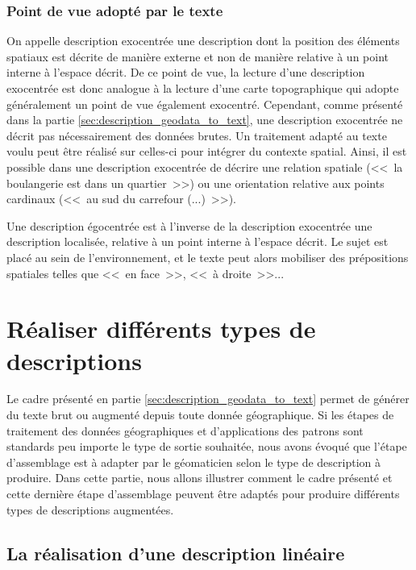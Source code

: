 \subsubsection{Point de vue adopté par le texte}

On appelle description exocentrée une description dont la position des éléments spatiaux est décrite de manière externe et non de manière relative à un point interne à l'espace décrit. De ce point de vue, la lecture d'une description exocentrée est donc analogue à la lecture d'une carte topographique qui adopte généralement un point de vue également exocentré. Cependant, comme présenté dans la partie \ref{sec:description_geodata_to_text}, une description exocentrée ne décrit pas nécessairement des données brutes. Un traitement adapté au texte voulu peut être réalisé sur celles-ci pour intégrer du contexte spatial. Ainsi, il est possible dans une description exocentrée de décrire une relation spatiale (<<~la boulangerie est dans un quartier~>>) ou une orientation relative aux points cardinaux (<<~au sud du carrefour (...)~>>).

\newpar{}

Une description égocentrée est à l'inverse de la description exocentrée une description localisée, relative à un point interne à l'espace décrit. Le sujet est placé au sein de l'environnement, et le texte peut alors mobiliser des prépositions spatiales telles que <<~en face~>>, <<~à droite~>>...

\section{Réaliser différents types de descriptions}

\label{sec:description_cas_utilisation}

Le cadre présenté en partie \ref{sec:description_geodata_to_text} permet de générer du texte brut ou augmenté depuis toute donnée géographique. Si les étapes de traitement des données géographiques et d'applications des patrons sont standards peu importe le type de sortie souhaitée, nous avons évoqué que l'étape d'assemblage est à adapter par le géomaticien selon le type de description à produire. Dans cette partie, nous allons illustrer comment le cadre présenté et cette dernière étape d'assemblage peuvent être adaptés pour produire différents types de descriptions augmentées.

\subsection{La réalisation d'une description linéaire}

